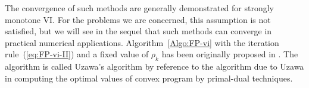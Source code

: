 The convergence of such methods are generally demonstrated for strongly monotone VI. For the problems we are concerned, this assumption is not satisfied, but we will see in the sequel that such methods can converge in practical numerical applications. 
Algorithm~\ref{Algo:FP-vi} with the iteration rule~(\ref{eq:FP-vi-II}) and a fixed value of $\rho_k$ has been originally proposed in \cite{DeSaxce.Feng1998}. The algorithm is called Uzawa's algorithm by reference to the algorithm due to Uzawa in computing the optimal values of convex program by primal-dual techniques.



